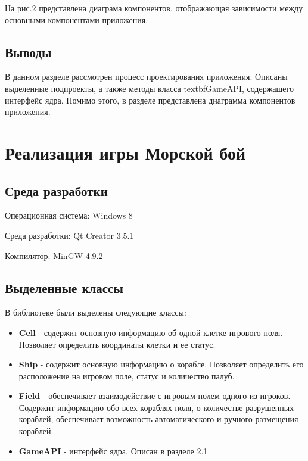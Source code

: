\documentclass[a4paper]{article}
\begin{document}
На рис.2 представлена диаграма компонентов, отображающая зависимости между основными компонентами приложения.

\subsection{Выводы}

В данном разделе рассмотрен процесс проектирования приложения. Описаны выделенные подпроекты, а также методы класса textbf{GameAPI}, содержащего интерфейс ядра. Помимо этого, в разделе представлена диаграмма компонентов приложения. 

\section{Реализация игры Морской бой}

\subsection{Среда разработки}

Операционная система: Windows 8

Среда разработки: Qt Creator 3.5.1

Компилятор: MinGW 4.9.2

\subsection{Выделенные классы}

В библиотеке были выделены следующие классы:
\begin{itemize}

\item \textbf{Cell}  - содержит основную информацию об одной клетке игрового поля. Позволяет определить координаты клетки и ее статус.

\item \textbf{Ship} - содержит основную информацию о корабле. Позволяет определить его расположение на игровом поле, статус и количество палуб.

\item \textbf{Field} - обеспечивает взаимодействие с игровым полем одного из игроков. Содержит информацию обо всех кораблях поля, о количестве разрушенных кораблей, обеспечивает возможность автоматического и ручного размещения кораблей.

\item \textbf{GameAPI} - интерфейс ядра. Описан в разделе 2.1 

\end{itemize}
\end{document}
